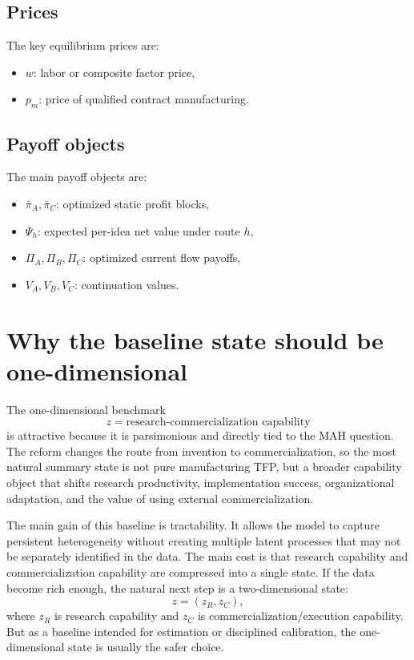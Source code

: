 \documentclass[12pt]{ctexart}
\begin{document}
\subsection{Prices}

The key equilibrium prices are:
\begin{itemize}[leftmargin=2em]
    \item $w$: labor or composite factor price,
    \item $p_m$: price of qualified contract manufacturing.
\end{itemize}

\subsection{Payoff objects}

The main payoff objects are:
\begin{itemize}[leftmargin=2em]
    \item $\bar{\pi}_A,\bar{\pi}_C$: optimized static profit blocks,
    \item $\Psi_h$: expected per-idea net value under route $h$,
    \item $\Pi_A,\Pi_B,\Pi_C$: optimized current flow payoffs,
    \item $V_A,V_B,V_C$: continuation values.
\end{itemize}

\section{Why the baseline state should be one-dimensional}

The one-dimensional benchmark
\[
z=\text{research-commercialization capability}
\]
is attractive because it is parsimonious and directly tied to the MAH question.
The reform changes the route from invention to commercialization, so the most natural
summary state is not pure manufacturing TFP, but a broader capability object that
shifts research productivity, implementation success, organizational adaptation, and
the value of using external commercialization.

The main gain of this baseline is tractability. It allows the model to capture persistent
heterogeneity without creating multiple latent processes that may not be separately
identified in the data. The main cost is that research capability and commercialization
capability are compressed into a single state. If the data become rich enough, the natural
next step is a two-dimensional state:
\[
z=(z_R,z_C),
\]
where $z_R$ is research capability and $z_C$ is commercialization/execution capability.
But as a baseline intended for estimation or disciplined calibration, the one-dimensional
state is usually the safer choice.
\end{document}

